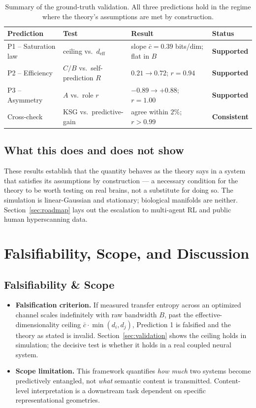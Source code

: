 \documentclass[11pt]{article}
\begin{document}
\begin{table}[t]
\centering
\small
\begin{tabular}{@{}llll@{}}
\toprule
\textbf{Prediction} & \textbf{Test} & \textbf{Result} & \textbf{Status} \\
\midrule
P1 -- Saturation law & ceiling vs.\ $d_{\mathrm{eff}}$ & slope $\bar{c}=0.39$ bits/dim; flat in $B$ & \textbf{Supported} \\
P2 -- Efficiency & $C/B$ vs.\ self-prediction $R$ & $0.21 \to 0.72$; $r=0.94$ & \textbf{Supported} \\
P3 -- Asymmetry & $A$ vs.\ role $r$ & $-0.89 \to +0.88$; $r=1.00$ & \textbf{Supported} \\
Cross-check & KSG vs.\ predictive-gain & agree within $2\%$; $r>0.99$ & \textbf{Consistent} \\
\bottomrule
\end{tabular}
\caption{Summary of the ground-truth validation. All three predictions hold in the regime where the theory's assumptions are met by construction.}
\label{tab:summary}
\end{table}

\subsection{What this does and does not show}
These results establish that the quantity behaves as the theory says in a system that satisfies its assumptions by construction --- a necessary condition for the theory to be worth testing on real brains, not a substitute for doing so. The simulation is linear-Gaussian and stationary; biological manifolds are neither. Section~\ref{sec:roadmap} lays out the escalation to multi-agent RL and public human hyperscanning data.

\section{Falsifiability, Scope, and Discussion}
\label{sec:discussion}

\subsection{Falsifiability \& Scope}
\begin{itemize}[leftmargin=1.2em]
    \item \textbf{Falsification criterion.} If measured transfer entropy across an optimized channel scales indefinitely with raw bandwidth $B$, past the effective-dimensionality ceiling $\bar{c}\cdot\min(d_i,d_j)$, Prediction 1 is falsified and the theory as stated is invalid. Section~\ref{sec:validation} shows the ceiling holds in simulation; the decisive test is whether it holds in a real coupled neural system.
    \item \textbf{Scope limitation.} This framework quantifies \emph{how much} two systems become predictively entangled, not \emph{what} semantic content is transmitted. Content-level interpretation is a downstream task dependent on specific representational geometries.
\end{itemize}
\end{document}
